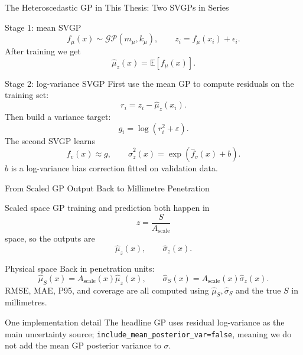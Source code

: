 \documentclass[aspectratio=169,11pt]{beamer}
\begin{document}
\begin{frame}{The Heteroscedastic GP in This Thesis: Two SVGPs in Series}
\small
\begin{block}{Stage 1: mean SVGP}
\footnotesize
\[
f_\mu(x)\sim\mathcal{GP}(m_\mu,k_\mu),
\qquad
z_i=f_\mu(x_i)+\epsilon_i.
\]
After training we get
\[
\hat\mu_z(x)=\mathbb E[f_\mu(x)].
\]
\end{block}

\begin{block}{Stage 2: log-variance SVGP}
\footnotesize
First use the mean GP to compute residuals on the training set:
\[
r_i=z_i-\hat\mu_z(x_i).
\]
Then build a variance target:
\[
g_i=\log(r_i^2+\varepsilon).
\]
The second SVGP learns
\[
f_v(x)\approx g,\qquad
\hat\sigma_z^2(x)=\exp(\hat f_v(x)+b).
\]
\(b\) is a log-variance bias correction fitted on validation data.
\end{block}
\end{frame}

\begin{frame}{From Scaled GP Output Back to Millimetre Penetration}
\small
\begin{block}{Scaled space}
\footnotesize
GP training and prediction both happen in
\[
z=\frac{S}{A_{\mathrm{scale}}}
\]
space, so the outputs are
\[
\hat\mu_z(x),\qquad \hat\sigma_z(x).
\]
\end{block}

\begin{block}{Physical space}
\footnotesize
Back in penetration units:
\[
\hat\mu_S(x)=A_{\mathrm{scale}}(x)\hat\mu_z(x),
\qquad
\hat\sigma_S(x)=A_{\mathrm{scale}}(x)\hat\sigma_z(x).
\]
RMSE, MAE, P95, and coverage are all computed using \(\hat\mu_S,\hat\sigma_S\) and the true \(S\) in millimetres.
\end{block}

\begin{block}{One implementation detail}
\footnotesize
The headline GP uses residual log-variance as the main uncertainty source;
\texttt{include\_mean\_posterior\_var=false}, meaning we do not add the mean GP posterior variance to \(\sigma\).
\end{block}
\end{frame}
\end{document}
